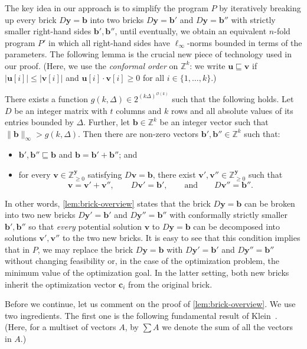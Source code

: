 \documentclass{article}
\renewcommand{\leq}{\leqslant}
\renewcommand{\geq}{\geqslant}
\newcommand{\cfleq}{\sqsubseteq}
\newcommand{\Z}{\mathbb{Z}}
\newcommand{\Zn}{\Z_{\geq 0}}
\newcommand{\tup}[1]{{\mathbf{#1}}}
\newcommand{\yy}{\tup y}
\newcommand{\bb}{\tup b}
\newcommand{\cc}{\tup c}
\newcommand{\uu}{\tup u}
\newcommand{\myvv}{\tup v} %
\newcommand{\Oh}{{\mathcal{O}}}
\begin{document}
The key idea in our approach is to simplify the program $P$ by iteratively breaking up every brick $D\yy=\bb$ into two bricks $D\yy=\bb'$ and $D\yy=\bb''$ with strictly smaller right-hand sides $\bb',\bb''$, until eventually, we obtain an equivalent $n$-fold program $P'$ in which all right-hand sides have  $\ell_\infty$-norms bounded in terms of the parameters. The following lemma is the crucial new piece of technology used in our proof. (Here, we use the {\em{conformal order}} on $\Z^k$: we write $\uu\cfleq \myvv$ if $|\uu[i]|\leq |\myvv[i]|$ and $\uu[i]\cdot\myvv[i]\geq 0$ for all $i\in \{1,\ldots,k\}$.)

\begin{lemma}\label{lem:brick-overview}
There exists a function $g(k,\Delta)\in 2^{(k\Delta)^{\Oh(k)}}$ such that the following holds. Let $D$ be an integer matrix with $t$ columns and $k$ rows and all absolute values of its entries bounded by $\Delta$. Further, let $\bb\in \Z^{k}$ be an integer vector such that $\|\bb\|_\infty>g(k,\Delta)$. Then there are non-zero vectors $\bb',\bb''\in \Z^k$ such that:
\begin{itemize}[nosep]
    \item $\bb',\bb''\cfleq \bb$ and $\bb=\bb'+\bb''$; and
    \item for every $\myvv\in \Zn^{\yy}$ satisfying $D\myvv=\bb$, there exist $\myvv',\myvv''\in \Zn^{\yy}$ such that
    $$\myvv=\myvv'+\myvv'',\qquad D\myvv'=\bb',\qquad\textrm{and}\qquad  D\myvv''=\bb''.$$
\end{itemize}
\end{lemma}

In other words, \cref{lem:brick-overview} states that the brick $D\yy=\bb$ can be broken into two new bricks $D\yy'=\bb'$ and $D\yy''=\bb''$ with conformally strictly smaller $\bb',\bb''$ so that {\em{every}} potential solution $\myvv$ to $D\yy=\bb$ can be decomposed into solutions $\myvv',\myvv''$ to the two new bricks. It is easy to see that this condition implies that in $P$, we may replace the brick $D\yy=\bb$ with $D\yy'=\bb'$ and $D\yy''=\bb''$ without changing feasibility or, in the case of the optimization problem, the minimum value of the optimization goal. In the latter setting, both new bricks inherit the optimization vector $\cc_i$ from the original brick.

Before we continue, let us comment on the proof of \cref{lem:brick-overview}. We use two ingredients. The first one is the following fundamental result of Klein~\cite{DBLP:journals/mp/Klein22}. (Here, for a multiset of vectors $A$, by $\sum A$ we denote the sum of all the vectors in $A$.)
\end{document}
